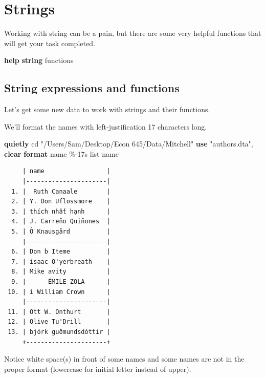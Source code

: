 \documentclass[
]{book}
\newenvironment{Shaded}{\begin{snugshade}}{\end{snugshade}}
\newcommand{\BaseNTok}[1]{\textcolor[rgb]{0.00,0.00,0.81}{#1}}
\newcommand{\FunctionTok}[1]{\textcolor[rgb]{0.13,0.29,0.53}{\textbf{#1}}}
\newcommand{\KeywordTok}[1]{\textcolor[rgb]{0.13,0.29,0.53}{\textbf{#1}}}
\newcommand{\NormalTok}[1]{#1}
\newcommand{\OtherTok}[1]{\textcolor[rgb]{0.56,0.35,0.01}{#1}}
\newcommand{\StringTok}[1]{\textcolor[rgb]{0.31,0.60,0.02}{#1}}
\begin{document}
\section{Strings}\label{strings}

Working with string can be a pain, but there are some very helpful functions that will get your task completed.

\begin{Shaded}
\begin{Highlighting}[]
\KeywordTok{help} \FunctionTok{string}\NormalTok{ functions}
\end{Highlighting}
\end{Shaded}

\subsection{String expressions and functions}\label{string-expressions-and-functions}

Let's get some new data to work with strings and their functions.

We'll format the names with left-justification 17 characters long.

\begin{Shaded}
\begin{Highlighting}[]
\KeywordTok{quietly}\NormalTok{ cd }\StringTok{"/Users/Sam/Desktop/Econ 645/Data/Mitchell"}
\KeywordTok{use} \StringTok{"authors.dta"}\NormalTok{, }\KeywordTok{clear}    
\KeywordTok{format} \BaseNTok{name}\NormalTok{ \%{-}17s}
\OtherTok{list} \BaseNTok{name} 
\end{Highlighting}
\end{Shaded}

\begin{verbatim}
     | name                 |
     |----------------------|
  1. |  Ruth Canaale        |
  2. | Y. Don Uflossmore    |
  3. | thích nhất hạnh      |
  4. | J. Carreño Quiñones  |
  5. | Ô Knausgård          |
     |----------------------|
  6. | Don b Iteme          |
  7. | isaac O'yerbreath    |
  8. | Mike avity           |
  9. |      ÉMILE ZOLA      |
 10. | i William Crown      |
     |----------------------|
 11. | Ott W. Onthurt       |
 12. | Olive Tu'Drill       |
 13. | björk guðmundsdóttir |
     +----------------------+
\end{verbatim}

Notice white space(s) in front of some names and some names are not in the proper format (lowercase for initial letter instead of upper).
\end{document}
